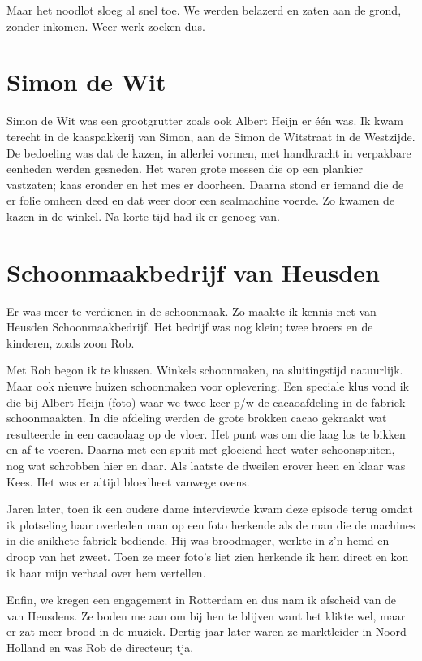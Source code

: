 \documentclass[12pt,twoside]{memoir}
\begin{document}
Maar het noodlot sloeg al snel toe. We werden belazerd en zaten aan de grond, zonder inkomen. Weer werk zoeken dus.

\chapter{Simon de Wit} %
\label{cha:wit}

Simon de Wit was een grootgrutter zoals ook Albert Heijn er één was. Ik kwam terecht in de kaaspakkerij van Simon, aan de Simon de Witstraat in de Westzijde. De bedoeling was dat de kazen, in allerlei vormen, met handkracht in verpakbare eenheden werden gesneden. Het waren grote messen die op een plankier vastzaten; kaas eronder en het mes er doorheen. Daarna stond er iemand die de er folie omheen deed en dat weer door een sealmachine voerde. Zo kwamen de kazen in de winkel. Na korte tijd had ik er genoeg van.

\chapter{Schoonmaakbedrijf van Heusden} %
\label{cha:schoonmaakbedrijf}

Er was meer te verdienen in de schoonmaak. Zo maakte ik kennis met van Heusden Schoonmaakbedrijf. Het bedrijf was nog klein; twee broers en de kinderen, zoals zoon Rob. 

Met Rob begon ik te klussen. Winkels schoonmaken, na sluitingstijd natuurlijk. Maar ook nieuwe huizen schoonmaken voor oplevering. Een speciale klus vond ik die bij Albert Heijn (foto) waar we twee keer p/w de cacaoafdeling in de fabriek schoonmaakten. In die afdeling werden de grote brokken cacao gekraakt wat resulteerde in een cacaolaag op de vloer. Het punt was om die laag los te bikken en af te voeren. Daarna met een spuit met gloeiend heet water schoonspuiten, nog wat schrobben hier en daar. Als laatste de dweilen erover heen en klaar was Kees. Het was er altijd bloedheet vanwege ovens. 

Jaren later, toen ik een oudere dame interviewde kwam deze episode terug omdat ik plotseling haar overleden man op een foto herkende als de man die de machines in die snikhete fabriek bediende. Hij was broodmager, werkte in z’n hemd en droop van het zweet. Toen ze meer foto’s liet zien herkende ik hem direct en kon ik haar mijn verhaal over hem vertellen.

Enfin, we kregen een engagement in Rotterdam en dus nam ik afscheid van de van Heusdens. Ze boden me aan om bij hen te blijven want het klikte wel, maar er zat meer brood in de muziek. Dertig jaar later waren ze marktleider in Noord-Holland en was Rob de directeur; tja.
\end{document}
